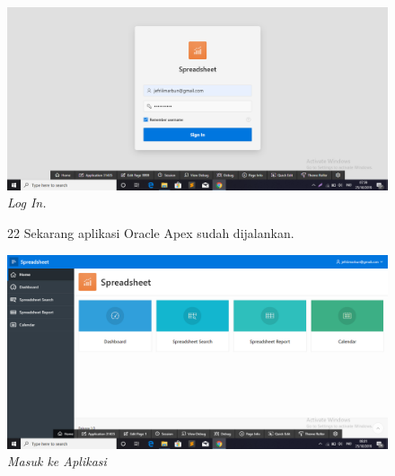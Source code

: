 \begin{enumerate}
\begin{figure}
      \begin{center}
\includegraphics[scale=0.4]{apex/apex8.png}
    \caption{\textit{Log In.}}
        \end{center}
\label{gambar}
\end{figure}

\begin{figure}
\item[22]Sekarang aplikasi Oracle Apex sudah dijalankan.

    \begin{center}
\includegraphics[scale=0.4]{apex/apex9.png}
    \caption{\textit{Masuk ke Aplikasi}}
        \end{center}
\label{gambar}
\end{figure}

\end{enumerate}
